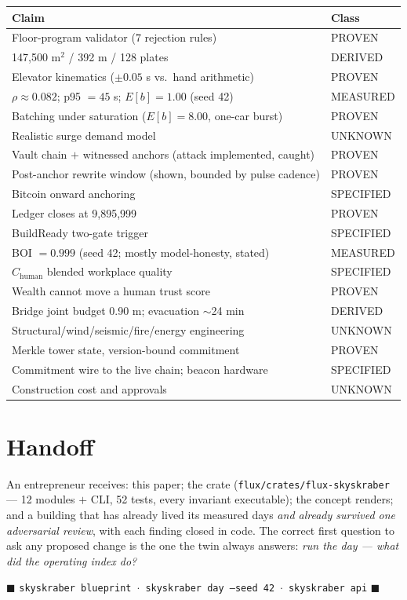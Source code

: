\documentclass[11pt,a4paper]{article}
\newcommand{\uqug}{\text{\textmu QUG}}
\begin{document}
\begin{center}\small
\begin{tabular}{@{}ll@{}}
\toprule
Claim & Class \\
\midrule
Floor-program validator (7 rejection rules) & PROVEN \\
147{,}500 m$^2$ / 392 m / 128 plates & DERIVED \\
Elevator kinematics ($\pm0.05$ s vs.\ hand arithmetic) & PROVEN \\
$\rho \approx 0.082$; p95 $=45$ s; $E[b]=1.00$ (seed 42) & MEASURED \\
Batching under saturation ($E[b]=8.00$, one-car burst) & PROVEN \\
Realistic surge demand model & UNKNOWN \\
Vault chain $+$ witnessed anchors (attack implemented, caught) & PROVEN \\
Post-anchor rewrite window (shown, bounded by pulse cadence) & PROVEN \\
Bitcoin onward anchoring & SPECIFIED \\
Ledger closes at 9{,}895{,}999 \uqug{} & PROVEN \\
BuildReady two-gate trigger & SPECIFIED \\
BOI $=0.999$ (seed 42; mostly model-honesty, stated) & MEASURED \\
$C_{\text{human}}$ blended workplace quality & SPECIFIED \\
Wealth cannot move a human trust score & PROVEN \\
Bridge joint budget 0.90 m; evacuation $\sim$24 min & DERIVED \\
Structural/wind/seismic/fire/energy engineering & UNKNOWN \\
Merkle tower state, version-bound commitment & PROVEN \\
Commitment wire to the live chain; beacon hardware & SPECIFIED \\
Construction cost and approvals & UNKNOWN \\
\bottomrule
\end{tabular}
\end{center}

\section{Handoff}

An entrepreneur receives: this paper; the crate
(\texttt{flux/crates/flux-skyskraber} --- 12 modules $+$ CLI, 52 tests, every
invariant executable); the concept renders; and a building that has already lived
its measured days \emph{and already survived one adversarial review}, with each
finding closed in code. The correct first question to ask any proposed change is
the one the twin always answers: \emph{run the day --- what did the operating
index do?}

\begin{center}
\vspace{4pt}
\textcolor{qgold}{$\blacksquare$}\quad
\texttt{skyskraber blueprint} \,$\cdot$\, \texttt{skyskraber day --seed 42}
\,$\cdot$\, \texttt{skyskraber api}\quad
\textcolor{qgold}{$\blacksquare$}
\end{center}
\end{document}
